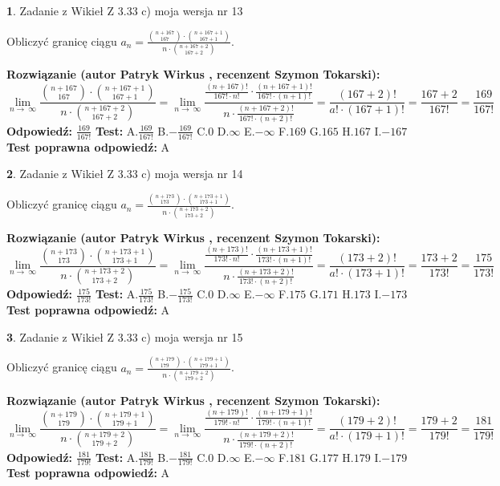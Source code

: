 \documentclass[12pt, a4paper]{article}
\theoremstyle{definition} %
\newtheorem{zad}{}
\newcommand{\zadStart}[1]{\begin{zad}#1\newline}
\newcommand{\zadStop}{\end{zad}}
\newcommand{\rozwStart}[2]{\noindent \textbf{Rozwiązanie (autor #1 , recenzent #2): }\newline}
\newcommand{\rozwStop}{\newline}
\newcommand{\odpStart}{\noindent \textbf{Odpowiedź:}\newline}
\newcommand{\odpStop}{\newline}
\newcommand{\testStart}{\noindent \textbf{Test:}\newline}
\newcommand{\testStop}{\newline}
\newcommand{\kluczStart}{\noindent \textbf{Test poprawna odpowiedź:}\newline}
\newcommand{\kluczStop}{\newline}
\begin{document}
\zadStart{Zadanie z Wikieł Z 3.33 c) moja wersja nr 13}

Obliczyć granicę ciągu $a_{n}=\frac{{n+167\choose167}\cdot{n+167+1\choose167+1}}{n\cdot{n+167+2\choose167+2}}$.
\zadStop
\rozwStart{Patryk Wirkus}{Szymon Tokarski}
$$\lim\limits_{n\to\ \infty}\frac{{n+167\choose167}\cdot{n+167+1\choose167+1}}{n\cdot{n+167+2\choose167+2}} = \lim\limits_{n\to\ \infty}\frac{\frac{(n+167)!}{167! \cdot n!}\cdot \frac{(n+167+1)!}{167! \cdot (n+1)!}}{n\cdot \frac{(n+167+2)!}{167! \cdot (n+2)!}} = \frac{(167+2)!}{a!\cdot (167+1)!} = \frac{167+2}{167!} = \frac{169}{167!}$$
\rozwStop
\odpStart
$\frac{169}{167!}$
\odpStop
\testStart
A.$\frac{169}{167!}$ B.$-\frac{169}{167!}$ C.$0$ D.$\infty$ E.$-\infty$
F.$169$ G.$165$
H.$167$
I.$-167$
\testStop
\kluczStart
A
\kluczStop



\zadStart{Zadanie z Wikieł Z 3.33 c) moja wersja nr 14}

Obliczyć granicę ciągu $a_{n}=\frac{{n+173\choose173}\cdot{n+173+1\choose173+1}}{n\cdot{n+173+2\choose173+2}}$.
\zadStop
\rozwStart{Patryk Wirkus}{Szymon Tokarski}
$$\lim\limits_{n\to\ \infty}\frac{{n+173\choose173}\cdot{n+173+1\choose173+1}}{n\cdot{n+173+2\choose173+2}} = \lim\limits_{n\to\ \infty}\frac{\frac{(n+173)!}{173! \cdot n!}\cdot \frac{(n+173+1)!}{173! \cdot (n+1)!}}{n\cdot \frac{(n+173+2)!}{173! \cdot (n+2)!}} = \frac{(173+2)!}{a!\cdot (173+1)!} = \frac{173+2}{173!} = \frac{175}{173!}$$
\rozwStop
\odpStart
$\frac{175}{173!}$
\odpStop
\testStart
A.$\frac{175}{173!}$ B.$-\frac{175}{173!}$ C.$0$ D.$\infty$ E.$-\infty$
F.$175$ G.$171$
H.$173$
I.$-173$
\testStop
\kluczStart
A
\kluczStop



\zadStart{Zadanie z Wikieł Z 3.33 c) moja wersja nr 15}

Obliczyć granicę ciągu $a_{n}=\frac{{n+179\choose179}\cdot{n+179+1\choose179+1}}{n\cdot{n+179+2\choose179+2}}$.
\zadStop
\rozwStart{Patryk Wirkus}{Szymon Tokarski}
$$\lim\limits_{n\to\ \infty}\frac{{n+179\choose179}\cdot{n+179+1\choose179+1}}{n\cdot{n+179+2\choose179+2}} = \lim\limits_{n\to\ \infty}\frac{\frac{(n+179)!}{179! \cdot n!}\cdot \frac{(n+179+1)!}{179! \cdot (n+1)!}}{n\cdot \frac{(n+179+2)!}{179! \cdot (n+2)!}} = \frac{(179+2)!}{a!\cdot (179+1)!} = \frac{179+2}{179!} = \frac{181}{179!}$$
\rozwStop
\odpStart
$\frac{181}{179!}$
\odpStop
\testStart
A.$\frac{181}{179!}$ B.$-\frac{181}{179!}$ C.$0$ D.$\infty$ E.$-\infty$
F.$181$ G.$177$
H.$179$
I.$-179$
\testStop
\kluczStart
A
\kluczStop
\end{document}
